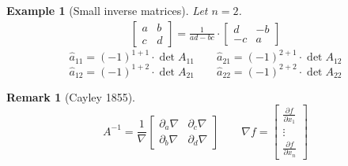 \documentclass{article}
\newcounter{lecref}[section]
\numberwithin{lecref}{section}
\newtheorem{example}[lecref]{Example}
\newtheorem{remark}[lecref]{Remark}
\begin{document}
\begin{example}[Small inverse matrices] %
  Let $n=2$.
  \begin{align*}
    \begin{bmatrix}
     a & b \\
     c & d
    \end{bmatrix}
    = \frac{1}{ad - bc} \cdot
    \begin{bmatrix} d & -b \\ -c & a \end{bmatrix}
  \end{align*}
  \[ \hat{a}_{11} = (-1)^{1+1} \cdot \det{A_{11}} \qquad \hat{a}_{21} = (-1)^{2+1} \cdot \det{A_{12}} \]
  \[ \hat{a}_{12} = (-1)^{1+2} \cdot \det{A_{21}} \qquad \hat{a}_{22} = (-1)^{2+2} \cdot \det{A_{22}} \]
\end{example}

\begin{remark}[Cayley 1855]
  \[
    A^{-1} = \frac{1}{\nabla} \begin{bmatrix} \partial_a \nabla & \partial_c \nabla \\ \partial_b \nabla & \partial_d \nabla \end{bmatrix} \qquad
    \nabla f = \begin{bmatrix} \frac{\partial f}{\partial x_1} \\ \vdots \\ \frac{\partial f}{\partial x_n} \end{bmatrix}
  \]
\end{remark}
\end{document}
